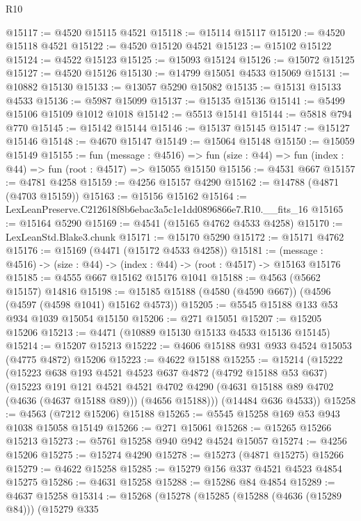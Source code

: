 \begin{lexlean}{R10}
\begin{coremodule}
@15117 := @4520 @15115 @4521
@15118 := @15114 @15117
@15120 := @4520 @15118 @4521
@15122 := @4520 @15120 @4521
@15123 := @15102 @15122
@15124 := @4522 @15123
@15125 := @15093 @15124
@15126 := @15072 @15125
@15127 := @4520 @15126
@15130 := @14799 @15051 @4533 @15069
@15131 := @10882 @15130
@15133 := @13057 @5290 @15082
@15135 := @15131 @15133 @4533
@15136 := @5987 @15099
@15137 := @15135 @15136
@15141 := @5499 @15106 @15109 @1012 @1018
@15142 := @5513 @15141
@15144 := @5818 @794 @770
@15145 := @15142 @15144
@15146 := @15137 @15145
@15147 := @15127 @15146
@15148 := @4670 @15147
@15149 := @15064 @15148
@15150 := @15059 @15149
@15155 := fun (message : @4516) =>
  fun (size : @44) => fun (index : @44) => fun (root : @4517) => @15055 @15150
@15156 := @4531 @667
@15157 := @4781 @4258
@15159 := @4256 @15157 @4290
@15162 := @14788 (@4871 (@4703 @15159))
@15163 := @15156 @15162
@15164 := LexLeanPreserve.C212618f8b6ebac3a5c1e1dd0896866e7.R10.__fits_16
@15165 := @15164 @5290
@15169 := @4541 (@15165 @4762 @4533 @4258)
@15170 := LexLeanStd.Blake3.chunk
@15171 := @15170 @5290
@15172 := @15171 @4762
@15176 := @15169 (@4471 (@15172 @4533 @4258))
@15181 := (message : @4516) -> (size : @44) -> (index : @44) -> (root : @4517) -> @15163 @15176
@15185 := @4555 @667 @15162 @15176 @1041
@15188 := @4563 (@5662 @15157) @14816
@15198 := @15185 @15188 (@4580 (@4590 @667)) (@4596 (@4597 (@4598 @1041) @15162 @4573))
@15205 := @5545 @15188 @133 @53 @934 @1039 @15054 @15150
@15206 := @271 @15051
@15207 := @15205 @15206
@15213 := @4471 (@10889 @15130 @15133 @4533 @15136 @15145)
@15214 := @15207 @15213
@15222 := @4606 @15188 @931 @933 @4524 @15053 (@4775 @4872) @15206
@15223 := @4622 @15188
@15255 := @15214
    (@15222
      (@15223
        @638
        @193
        @4521
        @4523
        @637
        @4872
        (@4792 @15188 @53 @637)
        (@15223
          @191
          @121
          @4521
          @4521
          @4702
          @4290
          (@4631 @15188 @89 @4702 (@4636 (@4637 @15188 @89)))
          (@4656 @15188)))
      (@14484 @636 @4533))
@15258 := @4563 (@7212 @15206) @15188
@15265 := @5545 @15258 @169 @53 @943 @1038 @15058 @15149
@15266 := @271 @15061
@15268 := @15265 @15266 @15213
@15273 := @5761 @15258 @940 @942 @4524 @15057
@15274 := @4256 @15206
@15275 := @15274 @4290
@15278 := @15273 (@4871 @15275) @15266
@15279 := @4622 @15258
@15285 := @15279 @156 @337 @4521 @4523 @4854 @15275
@15286 := @4631 @15258
@15288 := @15286 @84 @4854
@15289 := @4637 @15258
@15314 := @15268
    (@15278
      (@15285
        (@15288 (@4636 (@15289 @84)))
        (@15279
          @335

\end{coremodule}
\end{lexlean}
